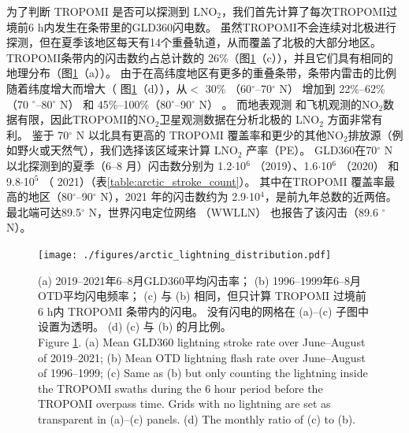 为了判断 TROPOMI 是否可以探测到 LNO$_2$，我们首先计算了每次TROPOMI过境前6 h内发生在条带里的GLD360闪电数。
虽然TROPOMI不会连续对北极进行探测，但在夏季该地区每天有14个重叠轨道，从而覆盖了北极的大部分地区。
TROPOMI条带内的闪击数约占总计数的 26\%（图\ref{fig:arctic_lightning_distribution}（c）），并且它们具有相同的地理分布（图\ref{fig:arctic_lightning_distribution}（a））。
由于在高纬度地区有更多的重叠条带，条带内雷击的比例随着纬度增大而增大（ 图\ref{fig:arctic_lightning_distribution}（d）），从$<$ 30\% （60$^{\circ}$--70$^{\circ}$ N） 增加到 22\%--62\% （70 $^{\circ}$--80$^{\circ}$ N） 和 45\%--100\%（80$^{\circ}$--90$^{\circ}$ N） 。
而地表观测\citep{Schmale.2018} 和飞机观测\citep{Jacob.2010}的NO$_2$数据有限，因此TROPOMI的NO$_2$卫星观测数据在分析北极的 LNO$_2$ 方面非常有利。
鉴于 70$^{\circ}$ N 以北具有更高的 TROPOMI 覆盖率和更少的其他NO$_2$排放源（例如野火或天然气），我们选择该区域来计算 LNO$_2$ 产率（PE）。
GLD360在70$^{\circ}$ N 以北探测到的夏季（6--8 月）闪击数分别为 1.2$\cdot$10$^6$ （2019）、1.6$\cdot$10$^6$ （2020） 和 9.8$\cdot$10$^5$ （ 2021）（表\ref{table:arctic_stroke_count}）。
其中在TROPOMI 覆盖率最高的地区（80$^{\circ}$--90$^{\circ}$ N），2021 年的闪击数约为 2.9$\cdot$10$^4$，是前九年总数的近两倍\citep{networktotal.2021}。
最北端可达89.5$^{\circ}$ N，世界闪电定位网络 （WWLLN） 也报告了该闪击（89.6 $^{\circ}$ N）\citep{Holzworth.2021}。


\begin{figure}[htbp]
\centering
\texttt{[image: ./figures/arctic\_lightning\_distribution.pdf]}
\caption{
(a) 2019--2021年6--8月GLD360平均闪击率；
(b) 1996--1999年6--8月OTD平均闪电频率；
(c) 与 (b) 相同，但只计算 TROPOMI 过境前 6 h内 TROPOMI 条带内的闪电。
没有闪电的网格在 (a)--(c) 子图中设置为透明。
(d) (c) 与 (b) 的月比例。\\
Figure \ref{fig:arctic_lightning_distribution}. (a) Mean GLD360 lightning stroke rate over June--August of 2019--2021;
(b) Mean OTD lightning flash rate over June--August of 1996--1999;
(c) Same as (b) but only counting the lightning inside the TROPOMI swaths during the 6 hour period before the TROPOMI overpass time.
Grids with no lightning are set as transparent in (a)--(c) panels.
(d) The monthly ratio of (c) to (b).
}
\label{fig:arctic_lightning_distribution}
\end{figure}


